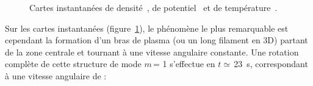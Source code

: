 \begin{refsection}
\begin{figure}[!htbp]
  \centering
    \caption{Cartes instantanées de densité~,
    de potentiel~ et de
    température~.}
    \label{CybeleCartesBase}
\end{figure}

 Sur les cartes instantanées 
 (figure~\ref{CybeleCartesBase}), le phénomène le plus remarquable est
 cependant la formation d'un bras de plasma (ou un long filament en 3D) partant
 de la zone centrale et tournant à une vitesse angulaire constante.
Une rotation complète de cette structure de mode $m\,$= 1 s'effectue en
$t\simeq\,$23~\micro s, correspondant à une vitesse angulaire de :


\end{refsection}
